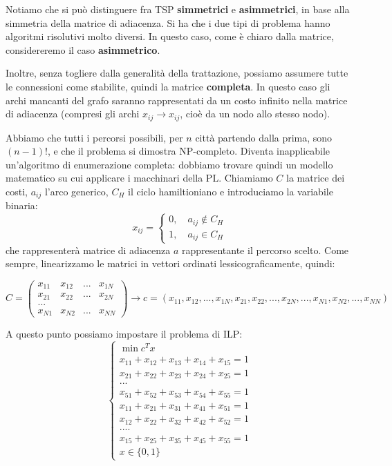 \documentclass[a4paper,11pt]{article}
\begin{document}
Notiamo che si può distinguere fra TSP \textbf{simmetrici} e \textbf{asimmetrici}, in base alla simmetria della matrice di adiacenza.
Si ha che i due tipi di problema hanno algoritmi risolutivi molto diversi.
In questo caso, come è chiaro dalla matrice, considereremo il caso \textbf{asimmetrico}.

Inoltre, senza togliere dalla generalità della trattazione, possiamo assumere tutte le connessioni come stabilite, quindi la matrice \textbf{completa}. In questo caso gli archi mancanti del grafo saranno rappresentati da un costo infinito nella matrice di adiacenza (compresi gli archi $x_{ij} \rightarrow x_{ij}$, cioè da un nodo allo stesso nodo).

Abbiamo che tutti i percorsi possibili, per $n$ città partendo dalla prima, sono $(n-1)!$, e che il problema si dimostra NP-completo. 
Diventa inapplicabile un'algoritmo di enumerazione completa: dobbiamo trovare quindi un modello matematico su cui applicare i macchinari della PL.
Chiamiamo $C$ la matrice dei costi, $a_{ij}$ l'arco generico, $C_H$ il ciclo hamiltioniano e introduciamo la variabile binaria:
$$
x_{ij} =
	\begin{cases}
		0, \quad a_{ij} \notin C_H \\
		1, \quad a_{ij} \in C_H
	\end{cases}
$$
che rappresenterà matrice di adiacenza $a$ rappresentante il percorso scelto.
Come sempre, linearizzamo le matrici in vettori ordinati lessicograficamente, quindi:

$$ C = \begin{pmatrix}
	x_{11} & x_{12} & ... & x_{1N} \\ 
	x_{21} & x_{22} & ... & x_{2N} \\ 
	... \\ 
	x_{N1} & x_{N2} & ... & x_{NN}
\end{pmatrix} \rightarrow c = (x_{11}, x_{12}, ..., x_{1N}, x_{21}, x_{22}, ..., x_{2N}, ..., x_{N1}, x_{N2}, ..., x_{NN}) $$

A questo punto possiamo impostare il problema di ILP:
\[
	\begin{cases}
		\min c^T x \\ 
		x_{11} + x_{12} + x_{13} + x_{14} + x_{15} = 1 \\ 
		x_{21} + x_{22} + x_{23} + x_{24} + x_{25} = 1 \\ 
		... \\ 
		x_{51} + x_{52} + x_{53} + x_{54} + x_{55} = 1 \\ 
		x_{11} + x_{21} + x_{31} + x_{41} + x_{51} = 1 \\ 
		x_{12} + x_{22} + x_{32} + x_{42} + x_{52} = 1 \\ 
		.... \\
		x_{15} + x_{25} + x_{35} + x_{45} + x_{55} = 1 \\ 
		x \in \{ 0, 1 \}
	\end{cases}
\]
\end{document}
